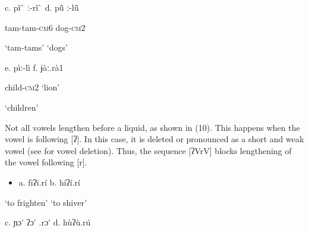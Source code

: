 \begin{styleindexi}
            c.   pĩ\`{} ː-rĩ\`{}                                                d.  pũ\={} ː-lũ\={}            
\end{styleindexi}

\begin{styleindexi}
                tam-tam-\textsc{cm}6                                      dog-\textsc{cm}2 
\end{styleindexi}

\begin{styleindexi}
                ‘tam-tams’                                          ‘dogs’
\end{styleindexi}

\begin{styleindexi}
            e.   pìː-lì                                              f.    ɉàː.rà1              
\end{styleindexi}

\begin{styleindexi}
                child-\textsc{cm}2                                           ‘lion’                  
\end{styleindexi}

\begin{styleindexi}
                ‘children’                                                        
\end{styleindexi}

Not all vowels lengthen before a liquid, as shown in (10). This happens when the vowel is following [ʔ]. In this case, it is deleted or pronounced as a short and weak vowel (see  for vowel deletion). Thus, the sequence [ʔVrV] blocks lengthening of the vowel following [r]. 

\begin{itemize}
\item \begin{styleindexi}
      \label{bkm:Ref475790025}a.   fīʔī.rí                                 b.   híʔí.rí        
\end{styleindexi}\end{itemize}
\begin{styleindexi}
                  ‘to frighten’                             ‘to shiver’   
\end{styleindexi}

\begin{styleindexi}
              c.   ɲɔ\'{} ʔɔ\'{} .rɔ\'{}                                d.   hùʔù.rú           
\end{styleindexi}

